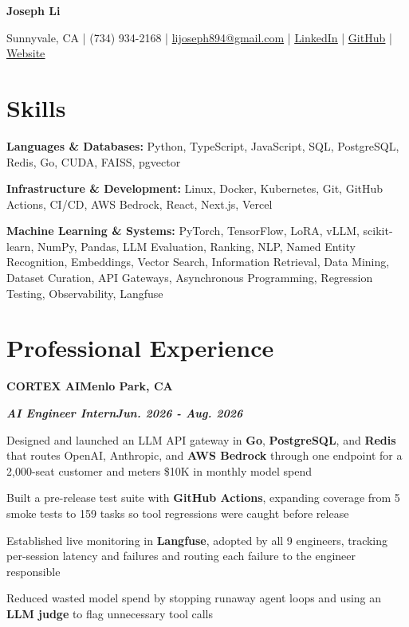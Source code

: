 \documentclass[10pt]{article}
\renewcommand{\resumeheader}[2]{%
  {\centering\fontsize{16}{18}\selectfont\bfseries #1\par}%
  \vspace{4pt}%
  {\centering\fontsize{10.5}{13}\selectfont #2\par}%
  \vspace{6pt}%
}
\renewcommand{\skill}[2]{\textbf{#1:} #2\par\vspace{1.5pt}}
\newcommand{\job}[4]{%
  \vspace{0pt}%
  \textbf{\MakeUppercase{#1}}\hfill\textbf{#2}\par
  \vspace{0.5pt}%
  \textbf{\textit{#3}}\hfill\textbf{\textit{#4}}\par
}
\begin{document}
\resumeheader{Joseph Li}{%
Sunnyvale, CA | (734) 934-2168 | \href{mailto:lijoseph894@gmail.com}{lijoseph894@gmail.com} | \href{https://www.linkedin.com/in/lijoseph894/}{\underline{LinkedIn}} | \href{https://github.com/josephl894}{\underline{GitHub}} | \href{https://josephl894.github.io}{\underline{Website}}}

\section{Skills}
\skill{Languages \& Databases}{Python, TypeScript, JavaScript, SQL, PostgreSQL, Redis, Go, CUDA, FAISS, pgvector}
\skill{Infrastructure \& Development}{Linux, Docker, Kubernetes, Git, GitHub Actions, CI/CD, AWS Bedrock, React, Next.js, Vercel}
\skill{Machine Learning \& Systems}{PyTorch, TensorFlow, LoRA, vLLM, scikit-learn, NumPy, Pandas, LLM Evaluation, Ranking, NLP, Named Entity Recognition, Embeddings, Vector Search, Information Retrieval, Data Mining, Dataset Curation, API Gateways, Asynchronous Programming, Regression Testing, Observability, Langfuse}

\section{Professional Experience}
\job{Cortex AI}{Menlo Park, CA}{AI Engineer Intern}{Jun. 2026 - Aug. 2026}
\begin{bullets}
  \item Designed and launched an LLM API gateway in \textbf{Go}, \textbf{PostgreSQL}, and \textbf{Redis} that routes OpenAI, Anthropic, and \textbf{AWS Bedrock} through one endpoint for a 2,000-seat customer and meters \$10K in monthly model spend
  \item Built a pre-release test suite with \textbf{GitHub Actions}, expanding coverage from 5 smoke tests to 159 tasks so tool regressions were caught before release
  \item Established live monitoring in \textbf{Langfuse}, adopted by all 9 engineers, tracking per-session latency and failures and routing each failure to the engineer responsible
  \item Reduced wasted model spend by stopping runaway agent loops and using an \textbf{LLM judge} to flag unnecessary tool calls
\end{bullets}
\end{document}
